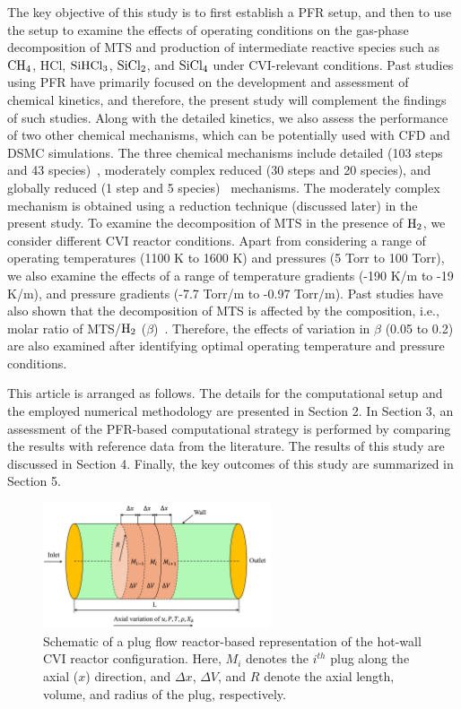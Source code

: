 \documentclass[final, letterpaper, square, comma, numbers, sort&compress]{elsarticle}
\begin{document}
The key objective of this study is to first establish a PFR setup, and then to use the setup to examine the effects of operating conditions on the gas-phase decomposition of MTS and production of intermediate reactive species such as $\rm CH_4$, HCl, $\rm SiHCl_3$, $\rm SiCl_2$, and $\rm SiCl_4$ under CVI-relevant conditions. Past studies using PFR have primarily focused on the development and assessment of chemical kinetics, and therefore, the present study will complement the findings of such studies. Along with the detailed kinetics, we also assess the performance of two other chemical mechanisms, which can be potentially used with CFD and DSMC simulations. The three chemical mechanisms include detailed (103 steps and 43 species)~\cite{Ge2007A,Ge2007B,Ge2010}, moderately complex reduced (30 steps and 20 species), and globally reduced (1 step and 5 species)~\cite{Mousavipour2004} mechanisms. The moderately complex mechanism is obtained using a reduction technique (discussed later) in the present study. To examine the decomposition of MTS in the presence of $\rm H_2$, we consider different CVI reactor conditions. Apart from considering a range of operating temperatures (1100 K to 1600 K) and pressures (5 Torr to 100 Torr), we also examine the effects of a range of temperature gradients (-190 K/m to -19 K/m), and pressure gradients (-7.7 Torr/m to -0.97 Torr/m). Past studies have also shown that the decomposition of MTS is affected by the composition, i.e., molar ratio of MTS/$\rm H_2$ ($\beta$)~\cite{Peng2021}. Therefore, the effects of variation in $\beta$ (0.05 to 0.2) are also examined after identifying optimal operating temperature and pressure conditions. 

This article is arranged as follows. The details for the computational setup and the employed numerical methodology are presented in Section 2. In Section 3, an assessment of the PFR-based computational strategy is performed by comparing the results with reference data from the literature. The results of this study are discussed in Section 4. Finally, the key outcomes of this study are summarized in Section 5.


\begin{figure}[t]
\centering\includegraphics[width=0.6\textwidth]{PFR-schematic.png}
\caption{Schematic of a plug flow reactor-based representation of the hot-wall CVI reactor configuration. Here, $M_i$ denotes the $i^{th}$ plug along the axial ($x$) direction, and $\Delta x$, $\Delta V$, and $R$ denote the axial length, volume, and radius of the plug, respectively.}
\label{PFR-schematic}
\end{figure}
\end{document}
